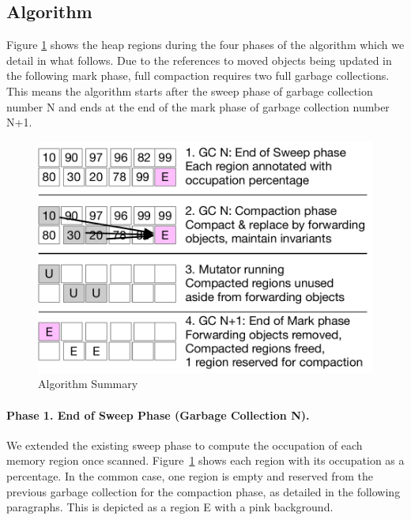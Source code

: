 \documentclass[sigplan,10pt,review,anonymous]{acmart}\settopmatter{printfolios=true,printccs=false,printacmref=false}
\begin{document}
\subsection{Algorithm}

Figure \ref{fig:Algo} shows the heap regions during the four phases of the algorithm which we detail in what follows. Due to the references to moved objects being updated in the following mark phase, full compaction requires two full garbage collections. 
This means the algorithm starts after the sweep phase of garbage collection number N and ends at the end of the mark phase of garbage collection number N+1.

\begin{figure}[bth]
		\vspace{-0.1cm}
		\includegraphics[width=.90\linewidth]{figures/SelectiveCompactFig} 
		\vspace{-0.3cm}
		\caption{Algorithm Summary\vspace{-0.3cm}}
		\label{fig:Algo}
 \end{figure}

\paragraph{Phase 1. End of Sweep Phase (Garbage Collection N).} We extended the existing sweep phase to compute the occupation of each memory region once scanned. 
Figure~\ref{fig:Algo} shows each region with its occupation as a percentage. 
In the common case, one region is empty and reserved from the previous garbage collection for the compaction phase, as detailed in the following paragraphs. 
This is depicted as a region E with a pink background.
\end{document}
